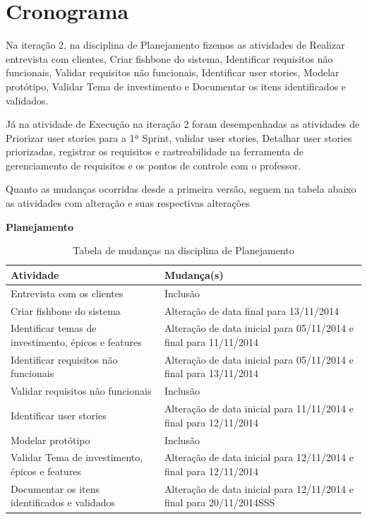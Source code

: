 \section{Cronograma}

Na iteração 2, na disciplina de Planejamento fizemos as atividades de Realizar entrevista com clientes, Criar fishbone do sistema, Identificar requisitos não funcionais, Validar requisitos não funcionais, Identificar user stories, Modelar protótipo, Validar Tema de investimento e Documentar os itens identificados e validados.

Já na atividade de Execução na iteração 2 foram desempenhadas as atividades de Priorizar user stories para a 1ª Sprint, validar user stories, Detalhar user stories priorizadas, registrar os requisitos e rastreabilidade na ferramenta de gerenciamento de requisitos e os pontos de controle com o professor.

Quanto as mudanças ocorridas desde a primeira versão, seguem na tabela abaixo as atividades com alteração e suas respectivas alterações

\textbf{Planejamento}
\begin{table}[H]
\caption{Tabela de mudanças na disciplina de Planejamento}
\centering
\begin{tabular}{ | p{3cm} | p{9cm}| }
\hline
\textbf{Atividade } & \textbf{Mudança(s)}\\ \hline
Entrevista com os clientes & Inclusão \\ \hline
Criar fishbone do sistema & Alteração de data final para 13/11/2014 \\ \hline
Identificar temas de investimento, épicos e features & Alteração de data inicial para 05/11/2014 e final para 11/11/2014 \\ \hline
Identificar requisitos não funcionais & Alteração de data inicial para 05/11/2014 e final para 13/11/2014\\ \hline
Validar requisitos não funcionais & Inclusão\\ \hline
Identificar user stories & Alteração de data inicial para 11/11/2014 e final para 12/11/2014 \\ \hline
Modelar protótipo & Inclusão\\ \hline
Validar Tema de investimento, épicos e features & Alteração de data inicial para 12/11/2014 e final para 12/11/2014\\ \hline
Documentar os itens identificados e validados & Alteração de data inicial para 12/11/2014 e final para 20/11/2014SSS\\ \hline
\end{tabular}
\end{table}

